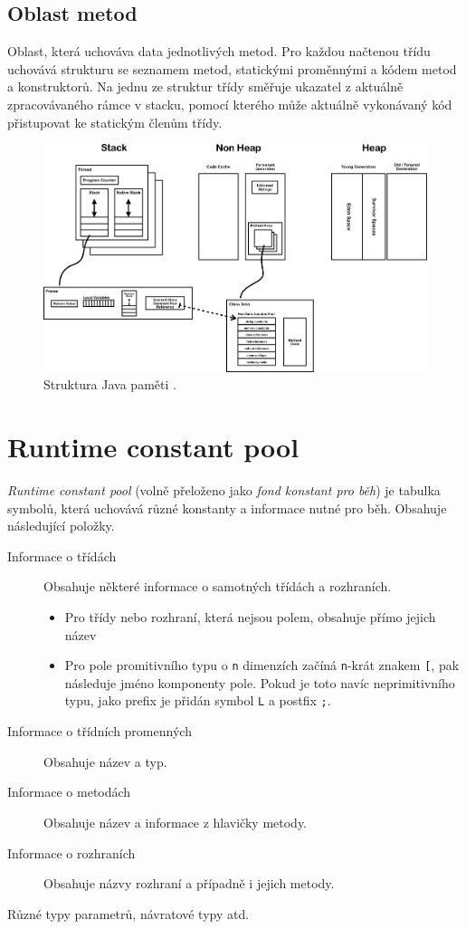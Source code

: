 \subsection{Oblast metod}
Oblast, která uchováva data jednotlivých metod. Pro každou načtenou třídu uchovává strukturu se seznamem metod, statickými proměnnými a kódem metod a konstruktorů. Na jednu ze struktur třídy směřuje ukazatel z aktuálně zpracovávaného rámce v stacku, pomocí kterého může aktuálně vykonávaný kód přistupovat ke statickým členům třídy.

\begin{figure}[h]
	\centering
	\includegraphics[scale=0.1]{obrazky/JVM_Internal_Architecture.png}
	\caption{Struktura Java paměti \cite{jvms-img}.}
	\label{obr-jvms-img}
\end{figure}

\section{Runtime constant pool}
\label{runtime-constant-pool}
\textit{Runtime constant pool} (volně přeloženo jako \textit{fond konstant pro běh}) je tabulka symbolů, která uchovává různé konstanty a informace nutné pro běh. Obsahuje následující položky.

\begin{description}
    \item[Informace o třídách] Obsahuje některé informace o samotných třídách a rozhraních.
        \begin{itemize}
            \item Pro třídy nebo rozhraní, která nejsou polem, obsahuje přímo jejich název
            \item Pro pole promitivního typu o \texttt{n} dimenzích začíná \texttt{n}-krát znakem \texttt{[}, pak následuje jméno komponenty pole. Pokud je toto navíc neprimitivního typu, jako prefix je přidán symbol \texttt{L} a postfix \texttt{;}.
        \end{itemize}
    \item[Informace o třídních promenných] Obsahuje název a typ.
    \item[Informace o metodách] Obsahuje název a informace z hlavičky metody.
    \item[Informace o rozhraních] Obsahuje názvy rozhraní a případně i jejich metody.   
    \item[Různé typy parametrů, návratové typy atd.]  
\end{description}

